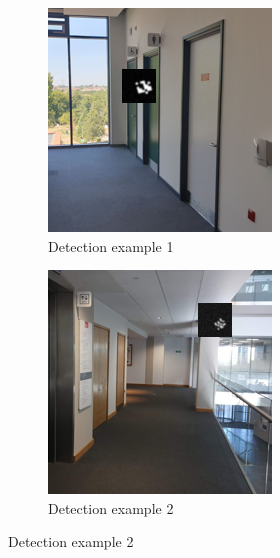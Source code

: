 \documentclass[conference]{IEEEtran}
\begin{document}
\begin{figure}[h]
  \centering
  \begin{subfigure}[b]{0.2\textwidth}
      \centering
      \includegraphics[width=\textwidth]{images/aruco-file3-detection-1.png}
      \caption{Detection example 1}
      \label{fig:det_ex1}
  \end{subfigure}
  \hfill
  \begin{subfigure}[b]{0.2\textwidth}
      \centering
      \includegraphics[width=\textwidth]{images/aruco-file3-detection-2.png}
      \caption{Detection example 2}
      \label{fig:det_ex2}
  \end{subfigure}
  

\end{figure}
\end{document}
